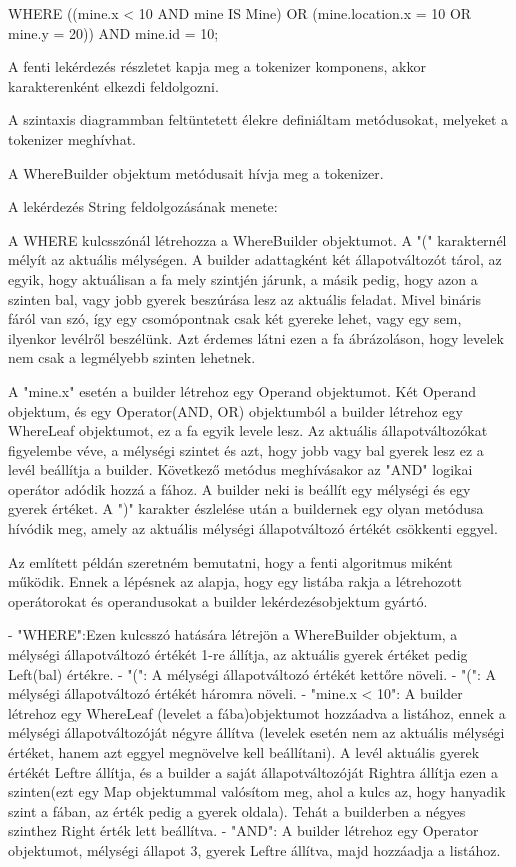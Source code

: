 WHERE ((mine.x < 10 AND mine IS Mine) OR (mine.location.x = 10 OR mine.y = 20)) AND mine.id = 10;

A fenti lekérdezés részletet kapja meg a tokenizer komponens, akkor karakterenként elkezdi feldolgozni.

A szintaxis diagrammban feltüntetett élekre definiáltam metódusokat, melyeket a tokenizer meghívhat. 

A WhereBuilder objektum metódusait hívja meg a tokenizer.

A lekérdezés String feldolgozásának menete:

A WHERE kulcsszónál létrehozza a WhereBuilder objektumot. 
A "(" karakternél mélyít az aktuális mélységen. A builder adattagként két állapotváltozót tárol, az egyik, hogy aktuálisan a fa mely szintjén járunk, a másik pedig, hogy azon a szinten bal, vagy jobb gyerek beszúrása lesz az aktuális feladat. Mivel bináris fáról van szó, így egy csomópontnak csak két gyereke lehet, vagy egy sem, ilyenkor levélről beszélünk. Azt érdemes látni ezen a fa ábrázoláson, hogy levelek nem csak a legmélyebb szinten lehetnek.

A "mine.x" esetén a builder létrehoz egy Operand objektumot. Két Operand objektum, és egy Operator(AND, OR) objektumból a builder létrehoz egy WhereLeaf objektumot, ez a fa egyik levele lesz. Az aktuális állapotváltozókat figyelembe véve, a mélységi szintet és azt, hogy jobb vagy bal gyerek lesz ez a levél beállítja a builder. Következő metódus meghívásakor az "AND" logikai operátor adódik hozzá a fához. A builder neki is beállít egy mélységi és egy gyerek értéket. A ")" karakter észlelése után a buildernek egy olyan metódusa hívódik meg, amely az aktuális mélységi állapotváltozó értékét csökkenti eggyel.

Az említett példán szeretném bemutatni, hogy a fenti algoritmus miként működik. Ennek a lépésnek az alapja, hogy egy listába rakja a létrehozott operátorokat és operandusokat a builder lekérdezésobjektum gyártó.

- "WHERE":Ezen kulcsszó hatására létrejön a WhereBuilder objektum, a mélységi állapotváltozó értékét 1-re állítja, az aktuális gyerek értéket pedig Left(bal) értékre.
- "(": A mélységi állapotváltozó értékét kettőre növeli.
- "(": A mélységi állapotváltozó értékét háromra növeli.
- "mine.x < 10": A builder létrehoz egy WhereLeaf (levelet a fába)objektumot hozzáadva a listához, ennek a mélységi állapotváltozóját négyre állítva (levelek esetén nem az aktuális mélységi értéket, hanem azt eggyel megnövelve kell beállítani). A levél aktuális gyerek értékét Leftre állítja, és a builder a saját állapotváltozóját Rightra állítja ezen a szinten(ezt egy Map objektummal valósítom meg, ahol a kulcs az, hogy hanyadik szint a fában, az érték pedig a gyerek oldala). Tehát a builderben a négyes szinthez Right érték lett beállítva.
- "AND": A builder létrehoz egy Operator objektumot, mélységi állapot 3, gyerek Leftre állítva, majd hozzáadja a listához.

